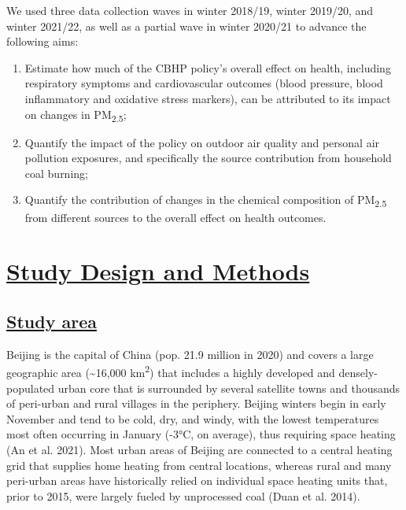 \documentclass[
  letterpaper,
  DIV=11,
  numbers=noendperiod]{scrartcl}
\providecommand{\DIFadd}[1]{{\protect\color{blue}\underline{#1}}} %
\providecommand{\DIFaddbegin}{} %
\providecommand{\DIFaddend}{} %
\providecommand{\DIFdelbegin}{} %
\providecommand{\DIFdelend}{} %
\newcommand{\DIFscaledelfig}{0.5}
\newlength{\DIFdelgraphicswidth} %
\newlength{\DIFdelgraphicsheight} %
\newcommand{\DIFaddincludegraphics}[2][]{{\color{blue}\fbox{\DIFOincludegraphics[#1]{#2}}}} %
\newcommand{\DIFdelincludegraphics}[2][]{%
\sbox{\DIFdelgraphicsbox}{\DIFOincludegraphics[#1]{#2}}%
\settoboxwidth{\DIFdelgraphicswidth}{\DIFdelgraphicsbox} %
\settoboxtotalheight{\DIFdelgraphicsheight}{\DIFdelgraphicsbox} %
\scalebox{\DIFscaledelfig}{%
\parbox[b]{\DIFdelgraphicswidth}{\usebox{\DIFdelgraphicsbox}\\[-\baselineskip] \rule{\DIFdelgraphicswidth}{0em}}\llap{\resizebox{\DIFdelgraphicswidth}{\DIFdelgraphicsheight}{%
\setlength{\unitlength}{\DIFdelgraphicswidth}%
\begin{picture}(1,1)%
\thicklines\linethickness{2pt} %
{\color[rgb]{1,0,0}\put(0,0){\framebox(1,1){}}}%
{\color[rgb]{1,0,0}\put(0,0){\line( 1,1){1}}}%
{\color[rgb]{1,0,0}\put(0,1){\line(1,-1){1}}}%
\end{picture}%
}\hspace*{3pt}}} %
} %
\DeclareRobustCommand{\DIFaddbegin}{\DIFOaddbegin \let\includegraphics\DIFaddincludegraphics} %
\DeclareRobustCommand{\DIFaddend}{\DIFOaddend \let\includegraphics\DIFOincludegraphics} %
\DeclareRobustCommand{\DIFdelbegin}{\DIFOdelbegin \let\includegraphics\DIFdelincludegraphics} %
\DeclareRobustCommand{\DIFdelend}{\DIFOaddend \let\includegraphics\DIFOincludegraphics} %
\begin{document}
We used three data collection waves in winter 2018/19, winter 2019/20,
and winter 2021/22, as well as a partial wave in winter 2020/21 to
advance the following aims:

\begin{enumerate}
\def\labelenumi{\arabic{enumi}.}
\item
  Estimate how much of the CBHP policy's overall effect on health,
  including respiratory symptoms and cardiovascular outcomes (blood
  pressure, blood inflammatory and oxidative stress markers), can be
  attributed to its impact on changes in PM\textsubscript{2.5};
\item
  Quantify the impact of the policy on outdoor air quality and personal
  air pollution exposures, and specifically the source contribution from
  household coal burning;
\item
  Quantify the contribution of changes in the chemical composition of
  PM\textsubscript{2.5} from different sources to the overall effect on
  health outcomes.
\end{enumerate}

\DIFdelbegin %
\DIFdelend \DIFaddbegin \section{\DIFadd{Study Design and Methods}}\label{study-design-and-methods}
\DIFaddend 

\DIFdelbegin %
\DIFdelend \DIFaddbegin \subsection{\DIFadd{Study area}}\label{study-area}
\DIFaddend 

Beijing is the capital of China (pop. 21.9 million in 2020) and covers a
large geographic area (\textasciitilde16,000 km\textsuperscript{2}) that
includes a highly developed and densely-populated urban core that is
surrounded by several satellite towns and thousands of peri-urban and
rural villages in the periphery. Beijing winters begin in early November
and tend to be cold, dry, and windy, with the lowest temperatures most
often occurring in January (-3°C, on average), thus requiring space
heating (An et al. 2021). Most urban areas of Beijing are connected to a
central heating grid that supplies home heating from central locations,
whereas rural and many peri-urban areas have historically relied on
individual space heating units that, prior to 2015, were largely fueled
by unprocessed coal (Duan et al. 2014).
\end{document}
